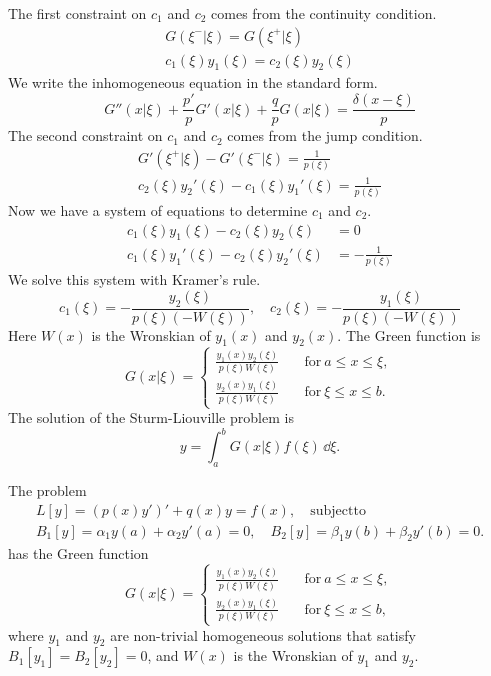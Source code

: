 The first constraint on $c_1$ and $c_2$ comes from the continuity condition.
\begin{gather*}
  G(\xi^-|\xi) = G(\xi^+|\xi)
  \\
  c_1(\xi) y_1(\xi) = c_2(\xi) y_2(\xi)
\end{gather*}
We write the inhomogeneous equation in the standard form.
\[ 
G''(x|\xi) + \frac{p'}{p} G'(x|\xi) + \frac{q}{p} G(x|\xi) = \frac{\delta(x-\xi)}{p}
\]
The second constraint on $c_1$ and $c_2$ comes from the jump condition.
\begin{gather*}
  G'(\xi^+|\xi) -  G'(\xi^-|\xi) = \frac{1}{p(\xi)} 
  \\
  c_2(\xi) y_2'(\xi) - c_1(\xi) y_1'(\xi) = \frac{1}{p(\xi)}
\end{gather*}
Now we have a system of equations to determine $c_1$ and $c_2$.
\begin{align*}
  c_1(\xi) y_1(\xi) - c_2(\xi) y_2(\xi) &= 0 
  \\
  c_1(\xi) y_1'(\xi) - c_2(\xi) y_2'(\xi) &= -\frac{1}{p(\xi)}
\end{align*}
We solve this system with Kramer's rule.
\[ 
c_1(\xi) = -\frac{y_2(\xi)}{p(\xi) (-W(\xi))}, \quad
c_2(\xi) = - \frac{y_1(\xi)}{p(\xi) (-W(\xi))}
\]
Here $W(x)$ is the Wronskian of $y_1(x)$ and $y_2(x)$.  
The Green function is
\[ 
\boxed{ 
  G(x|\xi) = 
  \begin{cases}
    \frac{y_1(x) y_2(\xi)}{p(\xi) W(\xi)} \quad &\mathrm{for}\ a \leq x \leq \xi, 
    \\
    \frac{y_2(x) y_1(\xi)}{p(\xi) W(\xi)} \quad &\mathrm{for}\ \xi \leq x \leq b.
  \end{cases} 
  }
\]
The solution of the Sturm-Liouville problem is 
\[
y = \int_a^b G(x|\xi) f(\xi) \,\dd \xi.
\]



\begin{Result}
  The problem
  \begin{gather*}
    L[y] = \left( p(x) y' \right)' + q(x) y = f(x), 
    \quad \mathrm{subject to}
    \\
    B_1[y] = \alpha_1 y(a) + \alpha_2 y'(a) = 0, \quad
    B_2[y] = \beta_1 y(b) + \beta_2 y'(b) = 0. 
  \end{gather*}
  has the Green function
  \[ 
  G(x|\xi) = 
  \begin{cases}
    \frac{y_1(x) y_2(\xi)}{p(\xi) W(\xi)} \quad &\mathrm{for}\ a \leq x \leq \xi, 
    \\
    \frac{y_2(x) y_1(\xi)}{p(\xi) W(\xi)} \quad &\mathrm{for}\ \xi \leq x \leq b,
  \end{cases} 
  \]
  where $y_1$ and $y_2$ are non-trivial homogeneous solutions that satisfy
  $B_1[y_1] = B_2[y_2] = 0$, and $W(x)$ is the Wronskian of $y_1$ and $y_2$.
\end{Result}








